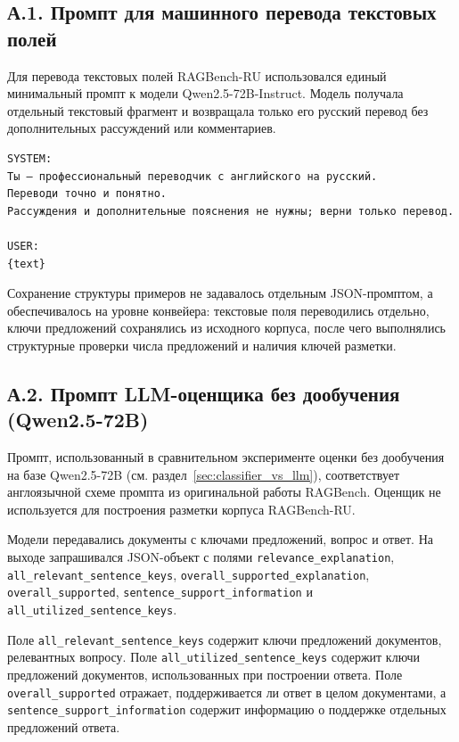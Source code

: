 \subsection*{А.1. Промпт для машинного перевода текстовых полей}

Для перевода текстовых полей RAGBench-RU использовался единый минимальный
промпт к модели Qwen2.5-72B-Instruct. Модель получала отдельный текстовый
фрагмент и возвращала только его русский перевод без дополнительных рассуждений
или комментариев.

\begin{verbatim}
SYSTEM:
Ты — профессиональный переводчик с английского на русский.
Переводи точно и понятно. 
Рассуждения и дополнительные пояснения не нужны; верни только перевод.

USER:
{text}
\end{verbatim}

Сохранение структуры примеров не задавалось отдельным JSON-промптом, а
обеспечивалось на уровне конвейера: текстовые поля переводились отдельно,
ключи предложений сохранялись из исходного корпуса, после чего выполнялись
структурные проверки числа предложений и наличия ключей разметки.

\subsection*{А.2. Промпт LLM-оценщика без дообучения (Qwen2.5-72B)}

Промпт, использованный в сравнительном эксперименте оценки без дообучения на базе
Qwen2.5-72B (см. раздел~\ref{sec:classifier_vs_llm}), соответствует англоязычной
схеме промпта из оригинальной работы RAGBench. Оценщик не используется для
построения разметки корпуса RAGBench-RU.

Модели передавались документы с ключами предложений, вопрос и ответ. На выходе
запрашивался JSON-объект с полями
\texttt{relevance\_explanation},
\texttt{all\_relevant\_sentence\_keys},
\texttt{overall\_supported\_explanation},
\texttt{overall\_supported},
\texttt{sentence\_support\_information} и
\texttt{all\_utilized\_sentence\_keys}.

Поле \texttt{all\_relevant\_sentence\_keys} содержит ключи предложений документов,
релевантных вопросу. Поле \texttt{all\_utilized\_sentence\_keys} содержит ключи
предложений документов, использованных при построении ответа. Поле
\texttt{overall\_supported} отражает, поддерживается ли ответ в целом документами,
а \texttt{sentence\_support\_information} содержит информацию о поддержке отдельных
предложений ответа.

